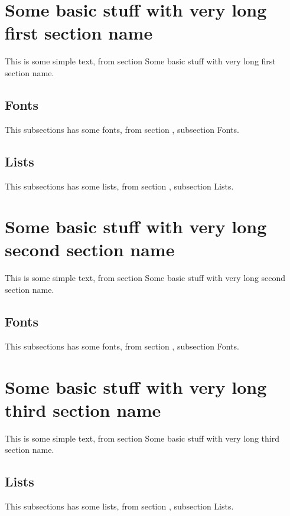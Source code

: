 \documentclass[10pt]{article}
\begin{document}
\tableofcontents

\section{Some basic stuff with very long first section name}

This is some simple text, from section \thesection{} Some basic stuff
with very long first section name.

\subsection{Fonts}

This subsections has some fonts, from section \thesection{},
subsection \thesubsection{} Fonts.

\subsection{Lists}

This subsections has some lists, from section \thesection{},
subsection \thesubsection{} Lists.

\section{Some basic stuff with very long second section name}

This is some simple text, from section \thesection{} Some basic stuff
with very long second section name.

\subsection{Fonts}

This subsections has some fonts, from section \thesection{},
subsection \thesubsection{} Fonts.

\section{Some basic stuff with very long third section name}

This is some simple text, from section \thesection{} Some basic stuff
with very long third section name.

\subsection{Lists}

This subsections has some lists, from section \thesection{},
subsection \thesubsection{} Lists.
\end{document}
